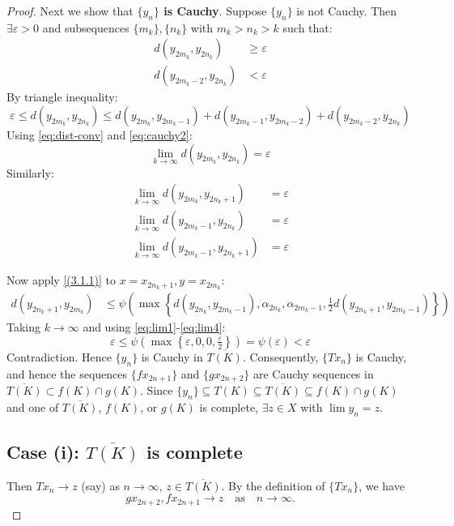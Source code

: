 \documentclass[a4paper,12pt,oneside]{article}
\numberwithin{equation}{section}
\begin{document}
\begin{proof}
Next we show that \textbf{$\{y_n\}$ is Cauchy}.
Suppose $\{y_n\}$ is not Cauchy. Then $\exists \varepsilon > 0$ and subsequences $\{m_k\}, \{n_k\}$ with $m_k > n_k > k$ such that:
\begin{align} 
d(y_{2m_k}, y_{2n_k}) &\geq \varepsilon \label{eq:cauchy1} \\
d(y_{2m_k-2}, y_{2n_k}) &< \varepsilon \label{eq:cauchy2}
\end{align}
By triangle inequality:
\[
\varepsilon \leq d(y_{2m_k}, y_{2n_k}) \leq d(y_{2m_k}, y_{2m_k-1}) + d(y_{2m_k-1}, y_{2m_k-2}) + d(y_{2m_k-2}, y_{2n_k})
\]
Using \eqref{eq:dist-conv} and \eqref{eq:cauchy2}:
\begin{equation} \label{eq:lim1}
\lim_{k \to \infty} d(y_{2m_k}, y_{2n_k}) = \varepsilon
\end{equation}
Similarly:
\begin{align}
\lim_{k \to \infty} d(y_{2m_k}, y_{2n_k+1}) &= \varepsilon \label{eq:lim2} \\
\lim_{k \to \infty} d(y_{2m_k-1}, y_{2n_k}) &= \varepsilon \label{eq:lim3} \\
\lim_{k \to \infty} d(y_{2m_k-1}, y_{2n_k+1}) &= \varepsilon \label{eq:lim4}
\end{align}

Now apply \eqref{(3.1.1)} to $x = x_{2n_k+1}, y = x_{2m_k}$:
\begin{align*}
d(y_{2n_k+1}, y_{2m_k}) &\leq \psi \left( \max \left\{ d(y_{2n_k}, y_{2m_k-1}), \alpha_{2n_k}, \alpha_{2m_k-1}, \tfrac{1}{2} d(y_{2n_k+1}, y_{2m_k-1}) \right\} \right)
\end{align*}
Taking $k \to \infty$ and using \eqref{eq:lim1}-\eqref{eq:lim4}:
\[
\varepsilon \leq \psi \left( \max \left\{ \varepsilon, 0, 0, \tfrac{\varepsilon}{2} \right\} \right) = \psi(\varepsilon) < \varepsilon
\]
Contradiction. Hence $\{y_n\}$ is Cauchy in $\overline{T(K)}$. Consequently, $\{Tx_n\}$ is Cauchy, and hence the sequences $\{fx_{2n+1}\}$ and $\{gx_{2n+2}\}$ are Cauchy sequences in $\overline{T(K)} \subset f(K) \cap g(K)$. Since $\{y_n\} \subseteq T(K) \subseteq \overline{T(K)} \subseteq f(K) \cap g(K)$ and one of $\overline{T(K)}$, $f(K)$, or $g(K)$ is complete, $\exists z \in X$ with $\lim y_n = z$.

\subsection*{Case (i): $\overline{T(K)}$ is complete}
Then $Tx_n \to z$ (say) as $n\to\infty$, $z\in\overline{T(K)}$. By the definition of $\{Tx_n\}$, we have
\[
gx_{2n+2}, fx_{2n+1} \to z \quad \text{as} \quad n\to\infty.
\]


\end{proof}
\end{document}
